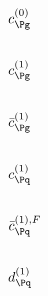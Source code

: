 
\subsection{$c_{\Pg}^{(0)}$}


\subsection{$c_{\Pg}^{(1)}$}


\subsection{$\bar c_{\Pg}^{(1)}$}


\subsection{$c_{\Pq}^{(1)}$}


\subsection{$\bar c_{\Pq}^{(1),F}$}


\subsection{$d_{\Pq}^{(1)}$}

